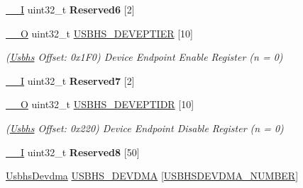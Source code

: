 \begin{DoxyCompactItemize}
\mbox{\label{structUsbhs_a4a46d1c40674d8160aad384e7ca3208c}} 
\mbox{\hyperlink{core__cm7_8h_af63697ed9952cc71e1225efe205f6cd3}{\+\_\+\+\_\+I}} uint32\+\_\+t {\bfseries Reserved6} \mbox{[}2\mbox{]}
\item 
\mbox{\label{structUsbhs_a3d33f6f512bdabeb3a6e82d3b6dbec57}} 
\mbox{\hyperlink{core__cm7_8h_a7e25d9380f9ef903923964322e71f2f6}{\+\_\+\+\_\+O}} uint32\+\_\+t \mbox{\hyperlink{structUsbhs_a3d33f6f512bdabeb3a6e82d3b6dbec57}{U\+S\+B\+H\+S\+\_\+\+D\+E\+V\+E\+P\+T\+I\+ER}} \mbox{[}10\mbox{]}
\begin{DoxyCompactList}\small\item\em (\mbox{\hyperlink{structUsbhs}{Usbhs}} Offset\+: 0x1\+F0) Device Endpoint Enable Register (n = 0) \end{DoxyCompactList}\item 
\mbox{\label{structUsbhs_a0cb62805e9598b1bed9ad59b4f4b803a}} 
\mbox{\hyperlink{core__cm7_8h_af63697ed9952cc71e1225efe205f6cd3}{\+\_\+\+\_\+I}} uint32\+\_\+t {\bfseries Reserved7} \mbox{[}2\mbox{]}
\item 
\mbox{\label{structUsbhs_a104e7185000e3cb9df6b9fe0ddaca88a}} 
\mbox{\hyperlink{core__cm7_8h_a7e25d9380f9ef903923964322e71f2f6}{\+\_\+\+\_\+O}} uint32\+\_\+t \mbox{\hyperlink{structUsbhs_a104e7185000e3cb9df6b9fe0ddaca88a}{U\+S\+B\+H\+S\+\_\+\+D\+E\+V\+E\+P\+T\+I\+DR}} \mbox{[}10\mbox{]}
\begin{DoxyCompactList}\small\item\em (\mbox{\hyperlink{structUsbhs}{Usbhs}} Offset\+: 0x220) Device Endpoint Disable Register (n = 0) \end{DoxyCompactList}\item 
\mbox{\label{structUsbhs_a5d63e161ca1decece64f3a228d0e6a1d}} 
\mbox{\hyperlink{core__cm7_8h_af63697ed9952cc71e1225efe205f6cd3}{\+\_\+\+\_\+I}} uint32\+\_\+t {\bfseries Reserved8} \mbox{[}50\mbox{]}
\item 
\mbox{\label{structUsbhs_a8ca2645e6b7598f5a9ad2ab8588d330e}} 
\mbox{\hyperlink{structUsbhsDevdma}{Usbhs\+Devdma}} \mbox{\hyperlink{structUsbhs_a8ca2645e6b7598f5a9ad2ab8588d330e}{U\+S\+B\+H\+S\+\_\+\+D\+E\+V\+D\+MA}} \mbox{[}\mbox{\hyperlink{group__SAMV71__USBHS_gaa1eaa94d02aee9562190980394b21191}{U\+S\+B\+H\+S\+D\+E\+V\+D\+M\+A\+\_\+\+N\+U\+M\+B\+ER}}\mbox{]}

\end{DoxyCompactItemize}
